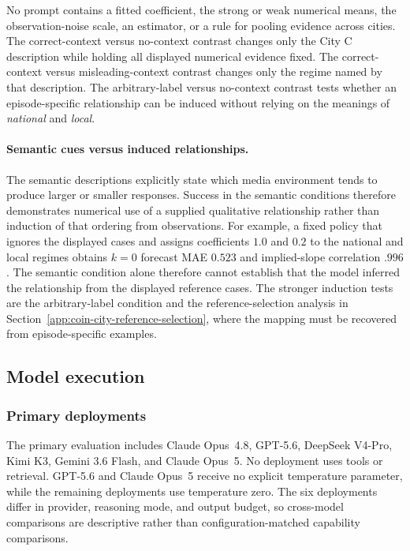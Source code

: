 No prompt contains a fitted coefficient, the strong or weak numerical means, the observation-noise scale, an estimator, or a rule for pooling evidence across cities.
The correct-context versus no-context contrast changes only the City C description while holding all displayed numerical evidence fixed.
The correct-context versus misleading-context contrast changes only the regime named by that description.
The arbitrary-label versus no-context contrast tests whether an episode-specific relationship can be induced without relying on the meanings of \emph{national} and \emph{local}.

\paragraph{Semantic cues versus induced relationships.}

The semantic descriptions explicitly state which media environment tends to produce larger or smaller responses.
Success in the semantic conditions therefore demonstrates numerical use of a supplied qualitative relationship rather than induction of that ordering from observations.
For example, a fixed policy that ignores the displayed cases and assigns coefficients \(1.0\) and \(0.2\) to the national and local regimes obtains \(k=0\) forecast MAE \(0.523\) and implied-slope correlation \(.996\).
The semantic condition alone therefore cannot establish that the model inferred the relationship from the displayed reference cases.
The stronger induction tests are the arbitrary-label condition and the reference-selection analysis in Section~\ref{app:coin-city-reference-selection}, where the mapping must be recovered from episode-specific examples.

\subsection{Model execution}
\label{app:coin-city-execution}

\subsubsection{Primary deployments}

The primary evaluation includes Claude Opus~4.8, GPT-5.6, DeepSeek V4-Pro, Kimi K3, Gemini 3.6 Flash, and Claude Opus~5.
No deployment uses tools or retrieval.
GPT-5.6 and Claude Opus~5 receive no explicit temperature parameter, while the remaining deployments use temperature zero.
The six deployments differ in provider, reasoning mode, and output budget, so cross-model comparisons are descriptive rather than configuration-matched capability comparisons.

